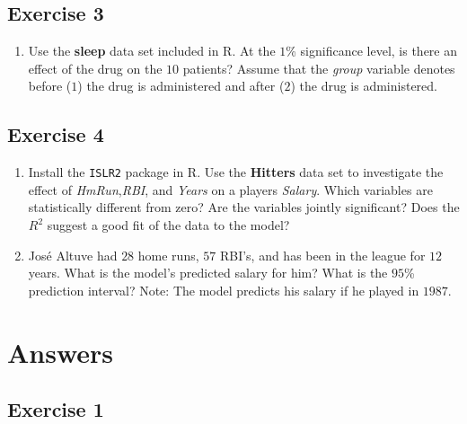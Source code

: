 \documentclass[
  letterpaper,
  DIV=11,
  numbers=noendperiod]{scrreprt}
\providecommand{\tightlist}{%
  \setlength{\itemsep}{0pt}\setlength{\parskip}{0pt}}\usepackage{longtable,booktabs,array}
\begin{document}
\hypertarget{exercise-3-26}{%
\subsection*{Exercise 3}\label{exercise-3-26}}

\begin{enumerate}
\def\labelenumi{\arabic{enumi}.}
\tightlist
\item
  Use the \textbf{sleep} data set included in R. At the \(1\)\%
  significance level, is there an effect of the drug on the \(10\)
  patients? Assume that the \emph{group} variable denotes before (\(1\))
  the drug is administered and after (\(2\)) the drug is administered.
\end{enumerate}

\hypertarget{exercise-4-16}{%
\subsection*{Exercise 4}\label{exercise-4-16}}

\begin{enumerate}
\def\labelenumi{\arabic{enumi}.}
\item
  Install the \texttt{ISLR2} package in R. Use the \textbf{Hitters} data
  set to investigate the effect of \emph{HmRun},\emph{RBI}, and
  \emph{Years} on a players \emph{Salary}. Which variables are
  statistically different from zero? Are the variables jointly
  significant? Does the \(R^2\) suggest a good fit of the data to the
  model?
\item
  José Altuve had \(28\) home runs, \(57\) RBI's, and has been in the
  league for \(12\) years. What is the model's predicted salary for him?
  What is the \(95\)\% prediction interval? Note: The model predicts his
  salary if he played in \(1987\).
\end{enumerate}

\hypertarget{answers-13}{%
\section{Answers}\label{answers-13}}

\hypertarget{exercise-1-27}{%
\subsection*{Exercise 1}\label{exercise-1-27}}
\end{document}
